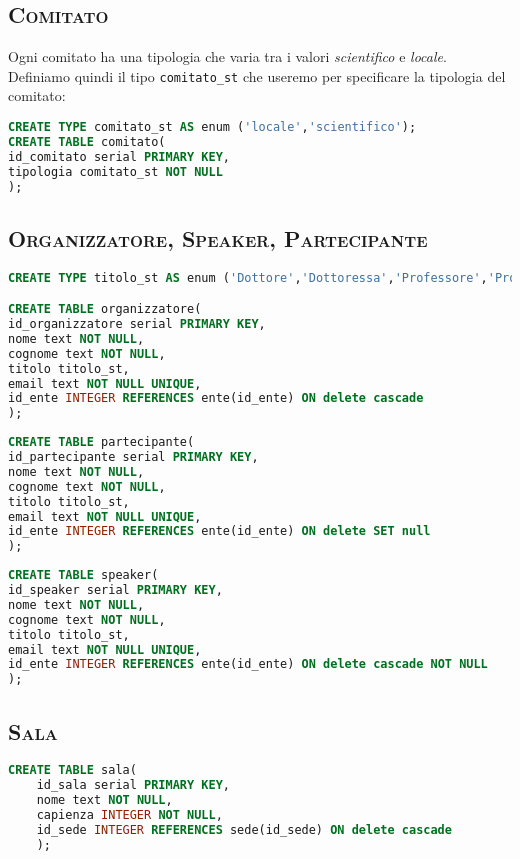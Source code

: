 \subsection{\textsc{Comitato}}
Ogni comitato ha una tipologia che varia tra i valori \textit{scientifico} e \textit{locale}. Definiamo quindi il tipo \texttt{comitato\_st} che useremo per specificare la tipologia del comitato:
\begin{lstlisting}[language=SQL,style=mystyle,caption={Tabella: Comitato}]
CREATE TYPE comitato_st AS enum ('locale','scientifico');
CREATE TABLE comitato(
id_comitato serial PRIMARY KEY,
tipologia comitato_st NOT NULL
);
\end{lstlisting}
\subsection{\textsc{Organizzatore, Speaker, Partecipante}}
\begin{lstlisting}[language=SQL,style=mystyle,caption={Tabella: Organizzatore}]
CREATE TYPE titolo_st AS enum ('Dottore','Dottoressa','Professore','Professoressa','Assistente','Ricercatore','Ricercatrice','Ingegnere');

CREATE TABLE organizzatore(
id_organizzatore serial PRIMARY KEY,
nome text NOT NULL,
cognome text NOT NULL,
titolo titolo_st,
email text NOT NULL UNIQUE,
id_ente INTEGER REFERENCES ente(id_ente) ON delete cascade
);
\end{lstlisting}
\begin{lstlisting}[language=SQL,style=mystyle,caption={Tabella: Partecipante}]
CREATE TABLE partecipante(
id_partecipante serial PRIMARY KEY,
nome text NOT NULL,
cognome text NOT NULL,
titolo titolo_st,
email text NOT NULL UNIQUE, 
id_ente INTEGER REFERENCES ente(id_ente) ON delete SET null
);
\end{lstlisting}
\begin{lstlisting}[language=SQL,style=mystyle, caption={Tabella: Speaker}]
CREATE TABLE speaker(
id_speaker serial PRIMARY KEY,
nome text NOT NULL,
cognome text NOT NULL,
titolo titolo_st,
email text NOT NULL UNIQUE,
id_ente INTEGER REFERENCES ente(id_ente) ON delete cascade NOT NULL
);
\end{lstlisting}
\subsection{\textsc{Sala}}
\begin{lstlisting}[language=SQL,style=mystyle,caption={Tabella: Sala}]
	CREATE TABLE sala(
	id_sala serial PRIMARY KEY,
	nome text NOT NULL,
	capienza INTEGER NOT NULL,
	id_sede INTEGER REFERENCES sede(id_sede) ON delete cascade
	);
\end{lstlisting}
